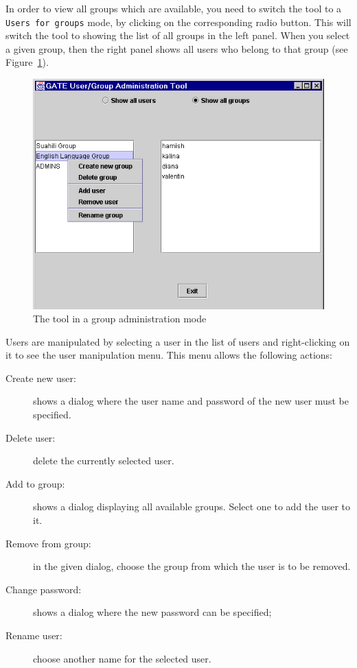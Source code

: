 In order to view all groups which are available, you need to switch the
tool to a {\tt Users for groups} mode, by clicking on the corresponding
radio button. This will switch the tool to showing the list of all
groups in the left panel. When you select a given group, then the right
panel shows all users who belong to that group (see
Figure~\ref{fig:user_group_tool_group_mode}).
%
\begin{figure}[htbp]
\begin{center}
\includegraphics[scale=0.5]{user-group-tool-group-mode.png}
\end{center}
\caption{The tool in a group administration mode}
\label{fig:user_group_tool_group_mode}
\end{figure}
%


Users are manipulated by selecting a user in the list of users and
right-clicking on it to see the user manipulation menu. This menu
allows the following actions:
\begin{description}
        \item[Create new user:] shows a dialog where the user name and
        password of the new user must be specified.
        \item[Delete user:] delete the currently selected user.
        \item[Add to group:] shows a dialog displaying all available
        groups. Select one to add the user to it.
        \item[Remove from group:] in the given dialog, choose the group
        from which the user is to be removed.
        \item[Change password:] shows a dialog where the new password
        can be specified;
        \item[Rename user:] choose another name for the selected user.
\end{description}

